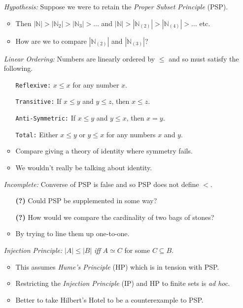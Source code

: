 \documentclass[a4paper, 11pt]{article} %
\newcommand{\abs}[1]{|#1|} %
\newcommand{\N}{\mathbb{N}}
\begin{document}
\begin{enumerate}
  \item[\it Hypothesis:] Suppose we were to retain the \textit{Proper Subset Principle} (PSP).
    \begin{itemize}[leftmargin=-.2in]
      \item Then $\abs{\N}>\abs{\N_{2}}>\abs{\N_{3}}>\ldots$ and $\abs{\N}>\abs{\N_{(2)}}>\abs{\N_{(4)}}>\ldots$ etc. 
      \item How are we to compare $\abs{\N_{(2)}}$ and $\abs{\N_{(3)}}$?
    \end{itemize}
  \item[\it Linear Ordering:] Numbers are linearly ordered by $\leq$ and so must satisfy the following.
    \begin{itemize}[leftmargin=-.2in]
      \item[\tt Reflexive:] $x \leq x$ for any number $x$.
      \item[\tt Transitive:] If $x \leq y$ and $y \leq z$, then $x \leq z$.
      \item[\tt Anti-Symmetric:] If $x \leq y$ and $y \leq x$, then $x = y$.
      \item[\tt Total:] Either $x \leq y$ or $y \leq x$ for any numbers $x$ and $y$.
      \item Compare giving a theory of identity where symmetry fails.
      \item We wouldn't really be talking about identity.
    \end{itemize}
  \item[\it Incomplete:] Converse of PSP is false and so PSP does not define $<$.
    \begin{itemize}[leftmargin=-.2in]
      \item[\bf (?)] Could PSP be supplemented in some way?
      \item[\bf (?)] How would we compare the cardinality of two bags of stones?
      \item By trying to line them up one-to-one.
    \end{itemize}
  \item[\it Injection Principle:] $\abs{A} \leq \abs{B}$ \textit{iff} $A \simeq C$ for some $C\subseteq B$. 
    \begin{itemize}[leftmargin=-.2in]
      \item This assumes \textit{Hume's Principle} (HP) which is in tension with PSP.
      \item Restricting the \textit{Injection Principle} (IP) and HP to finite sets is \textit{ad hoc}.
      \item Better to take Hilbert's Hotel to be a counterexample to PSP.
    \end{itemize}
\end{enumerate}
\end{document}
